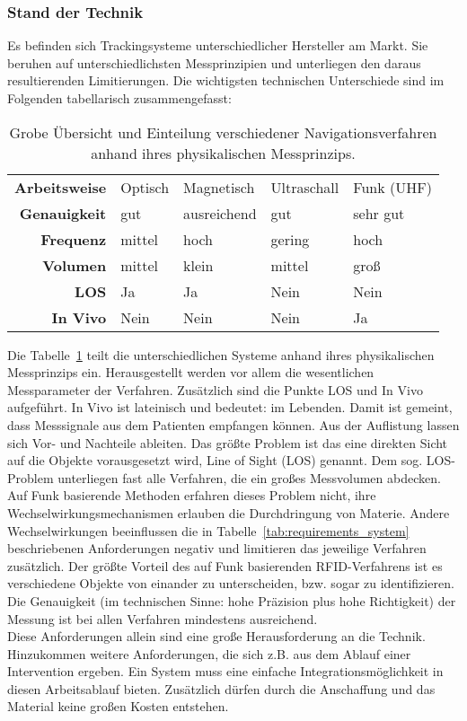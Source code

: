 \subsubsection{Stand der Technik}
Es befinden sich Trackingsysteme unterschiedlicher Hersteller am Markt. Sie beruhen auf unterschiedlichsten Messprinzipien und unterliegen den daraus resultierenden Limitierungen. Die wichtigsten technischen Unterschiede sind im Folgenden tabellarisch zusammengefasst:
%
\begin{table} [H]
	\begin{center}
		\begin{tabular}{rllll}
			\textbf{Arbeitsweise} & Optisch & Magnetisch & Ultraschall & Funk (UHF) \\
			\textbf{Genauigkeit} & gut & ausreichend & gut & sehr gut \\
			\textbf{Frequenz} & mittel & hoch & gering & hoch \\
			\textbf{Volumen} & mittel & klein & mittel & groß \\
			\textbf{LOS} & Ja & Ja & Nein & Nein \\
			\textbf{In Vivo} & Nein   & Nein & Nein & Ja \\
%			
		\end{tabular}
	\end{center}
	\caption[Übersicht Navigationsverfahren]{Grobe Übersicht und Einteilung verschiedener Navigationsverfahren anhand ihres physikalischen Messprinzips.}
	\label{tab:overview_tracking}
\end{table}
%
Die Tabelle~\ref{tab:overview_tracking} teilt die unterschiedlichen Systeme anhand ihres physikalischen Messprinzips ein. Herausgestellt werden vor allem die wesentlichen Messparameter der Verfahren. Zusätzlich sind die Punkte LOS und In Vivo aufgeführt. In Vivo ist lateinisch und bedeutet: im Lebenden. Damit ist gemeint, dass Messsignale aus dem Patienten empfangen können. Aus der Auflistung lassen sich Vor- und Nachteile ableiten. Das größte Problem ist das eine direkten Sicht auf die Objekte vorausgesetzt wird, Line of Sight (LOS) genannt. Dem sog. LOS-Problem unterliegen fast alle Verfahren, die ein großes Messvolumen abdecken. Auf Funk basierende Methoden erfahren dieses Problem nicht, ihre Wechselwirkungsmechanismen erlauben die Durchdringung von Materie. Andere Wechselwirkungen beeinflussen die in Tabelle~\ref{tab:requirements_system} beschriebenen Anforderungen negativ und limitieren das jeweilige Verfahren zusätzlich. Der größte Vorteil des auf Funk basierenden RFID-Verfahrens ist es verschiedene Objekte von einander zu unterscheiden, bzw. sogar zu identifizieren. Die Genauigkeit (im technischen Sinne: hohe Präzision plus hohe Richtigkeit) der Messung ist bei allen Verfahren mindestens ausreichend. \\
%

Diese Anforderungen allein sind eine große Herausforderung an die Technik. Hinzukommen weitere Anforderungen, die sich z.B. aus dem Ablauf einer Intervention ergeben. Ein System muss eine einfache Integrationsmöglichkeit in diesen Arbeitsablauf bieten. Zusätzlich dürfen durch die Anschaffung und das Material keine großen Kosten entstehen.\\
%
